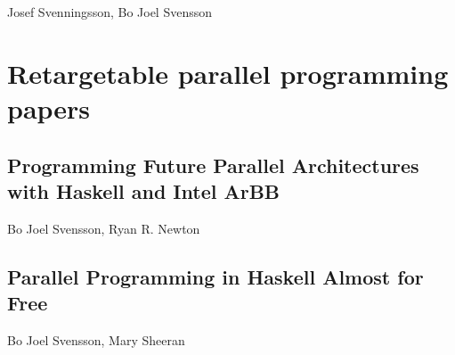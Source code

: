 \documentclass[a4paper]{book}
\begin{document}
\begin{center} 
Josef Svenningsson, Bo Joel Svensson
\end{center}





% 

\chapter{Retargetable parallel programming papers}
% 
\cleardoublepage 


\section{Programming Future Parallel Architectures with Haskell and Intel ArBB}

\begin{center} 
Bo Joel Svensson, Ryan R. Newton
\end{center}




% 
\cleardoublepage 


\section{Parallel Programming in Haskell Almost for Free}

\begin{center} 
Bo Joel Svensson, Mary Sheeran
\end{center}





\cleardoublepage




\end{document}
